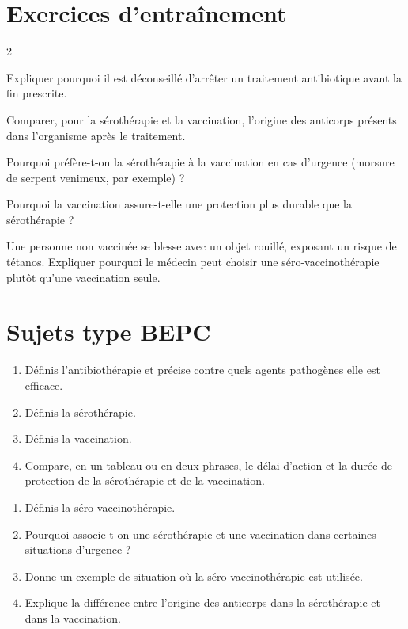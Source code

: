 \section{Exercices d'entraînement}
\begin{multicols}{2}

\exo{} Expliquer pourquoi il est déconseillé d'arrêter un traitement
antibiotique avant la fin prescrite.

\exo{} Comparer, pour la sérothérapie et la vaccination, l'origine des
anticorps présents dans l'organisme après le traitement.

\exo{} Pourquoi préfère-t-on la sérothérapie à la vaccination en cas
d'urgence (morsure de serpent venimeux, par exemple) ?

\exo{} Pourquoi la vaccination assure-t-elle une protection plus durable que
la sérothérapie ?

\exo{} Une personne non vaccinée se blesse avec un objet rouillé, exposant un
risque de tétanos. Expliquer pourquoi le médecin peut choisir une
séro-vaccinothérapie plutôt qu'une vaccination seule.

\end{multicols}

\section{Sujets type BEPC}

\begin{enumerate}[label=\arabic*)]
\item Définis l'antibiothérapie et précise contre quels agents pathogènes elle est
efficace.
\item Définis la sérothérapie.
\item Définis la vaccination.
\item Compare, en un tableau ou en deux phrases, le délai d'action et la durée de
protection de la sérothérapie et de la vaccination.
\end{enumerate}

\begin{enumerate}[label=\arabic*)]
\item Définis la séro-vaccinothérapie.
\item Pourquoi associe-t-on une sérothérapie et une vaccination dans certaines
situations d'urgence ?
\item Donne un exemple de situation où la séro-vaccinothérapie est utilisée.
\item Explique la différence entre l'origine des anticorps dans la sérothérapie et
dans la vaccination.
\end{enumerate}

